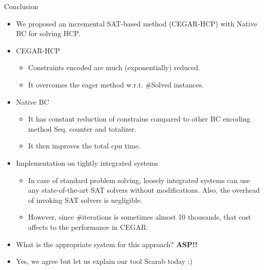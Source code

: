 \documentclass{beamer}
\begin{document}
\begin{frame}{Conclusion}
\begin{itemize}
\item We proposed an incremental SAT-based method (CEGAR-HCP) with
  Native BC for solving HCP. 
\item CEGAR-HCP
\begin{itemize}
\item Constraints encoded are much (exponentially) reduced. 
\item It overcomes the eager method w.r.t. \#Solved instances. 
\end{itemize}
\item Native BC
\begin{itemize}
\item It has constant reduction of constrains compared to other BC
  encoding method Seq. counter and totalizer. 
\item It then improves the total cpu time. 
\end{itemize}
\item Implementation on tightly integrated systems
\begin{itemize}
\item In case of standard problem solving, loosely integrated systems
  can use any state-of-the-art SAT solvers without
  modifications. Also, the overhead of invoking SAT solvers is
  negligible. 
\item However, since \#iterations is sometimes almost 10 thousands,
  that cost affects to the performance in CEGAR. 
\end{itemize}
\end{itemize}

\pause
\begin{alertblock}{}
  \begin{itemize}[<+->]
    \item What is the appropriate system for this approach? \textbf{\alert{ASP!!}}
    \item Yes, we agree but let us explain our tool Scarab today :)
  \end{itemize}
\end{alertblock}
\end{frame}
\end{document}
